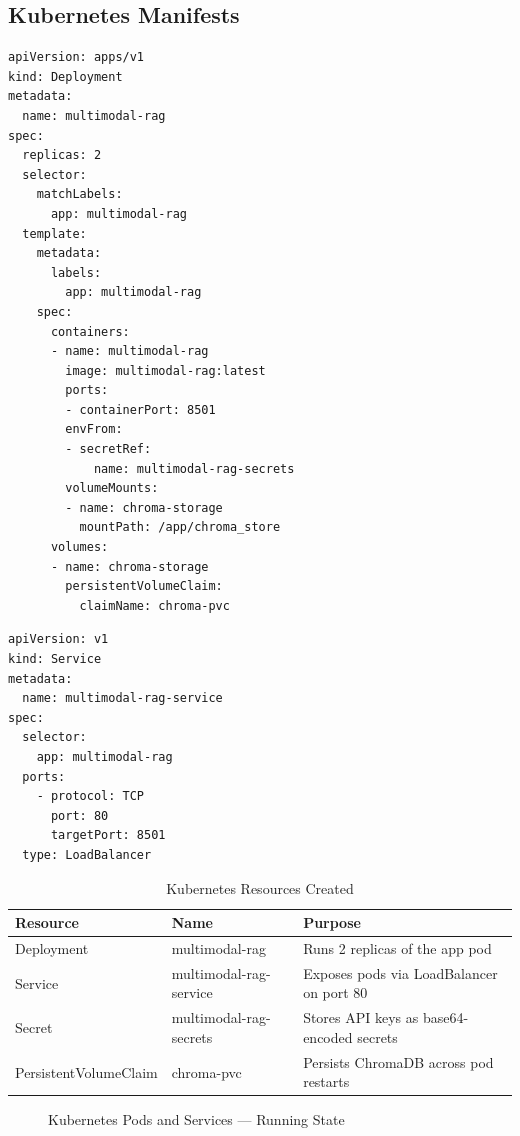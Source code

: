 \documentclass[12pt,a4paper]{report}
\begin{document}
\subsection{Kubernetes Manifests}

\begin{lstlisting}[caption=Kubernetes Deployment Manifest]
apiVersion: apps/v1
kind: Deployment
metadata:
  name: multimodal-rag
spec:
  replicas: 2
  selector:
    matchLabels:
      app: multimodal-rag
  template:
    metadata:
      labels:
        app: multimodal-rag
    spec:
      containers:
      - name: multimodal-rag
        image: multimodal-rag:latest
        ports:
        - containerPort: 8501
        envFrom:
        - secretRef:
            name: multimodal-rag-secrets
        volumeMounts:
        - name: chroma-storage
          mountPath: /app/chroma_store
      volumes:
      - name: chroma-storage
        persistentVolumeClaim:
          claimName: chroma-pvc
\end{lstlisting}

\begin{lstlisting}[caption=Kubernetes Service Manifest]
apiVersion: v1
kind: Service
metadata:
  name: multimodal-rag-service
spec:
  selector:
    app: multimodal-rag
  ports:
    - protocol: TCP
      port: 80
      targetPort: 8501
  type: LoadBalancer
\end{lstlisting}

\begin{table}[H]
\centering
\caption{Kubernetes Resources Created}
\begin{tabular}{p{3cm}p{4cm}p{6cm}}
\toprule
\textbf{Resource} & \textbf{Name} & \textbf{Purpose} \\
\midrule
Deployment & multimodal-rag & Runs 2 replicas of the app pod \\
Service & multimodal-rag-service & Exposes pods via LoadBalancer on port 80 \\
Secret & multimodal-rag-secrets & Stores API keys as base64-encoded secrets \\
PersistentVolumeClaim & chroma-pvc & Persists ChromaDB across pod restarts \\
\bottomrule
\end{tabular}
\end{table}

\begin{figure}[H]
    \centering
    \caption{Kubernetes Pods and Services --- Running State}
    \label{fig:kubernetes_pods}
\end{figure}
\end{document}
